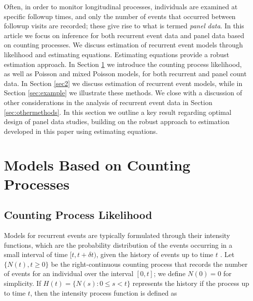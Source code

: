 \documentclass[12pt]{article}
\begin{document}
Often, in order to monitor longitudinal processes, individuals are examined at specific followup times, and only the number of events that occurred between followup visits are recorded; these give rise to what is termed {\it panel data}. In this article we focus on inference for both recurrent event data and panel data based on counting processes. We discuss estimation of recurrent event models through likelihood and estimating equations. Estimating equations provide a robust estimation approach. In Section \ref{sec1} we introduce the counting process likelihood, as well as Poisson and mixed Poisson models, for both recurrent and panel count data. In Section \ref{sec2} we discuss estimation of recurrent event models, while in Section \ref{sec:example} we illustrate these methods. We close with a discussion of other considerations in the analysis of recurrent event data in Section \ref{sec:othermethods}. In this section we outline a key result regarding optimal design of panel data studies, building on the robust approach to estimation developed in this paper using estimating equations.


\section{Models Based on Counting Processes} \label{sec1}

\subsection{Counting Process Likelihood}
Models for recurrent events are typically formulated through their intensity functions, which are the probability distribution of the events occurring in a small interval of time $[t, t+\delta t)$, given the history of events up to time $t$ \citep{cook2007statistical}. Let $\{N(t), t\geq 0 \}$ be the right-continuous counting process that records the number of events for an individual over the interval $[0,t]$; we define $N(0)=0$ for simplicity. If $H(t)=\{N(s): 0\leq s<t \}$ represents the history if the process up to time $t$, then the intensity process function is defined as
\end{document}
